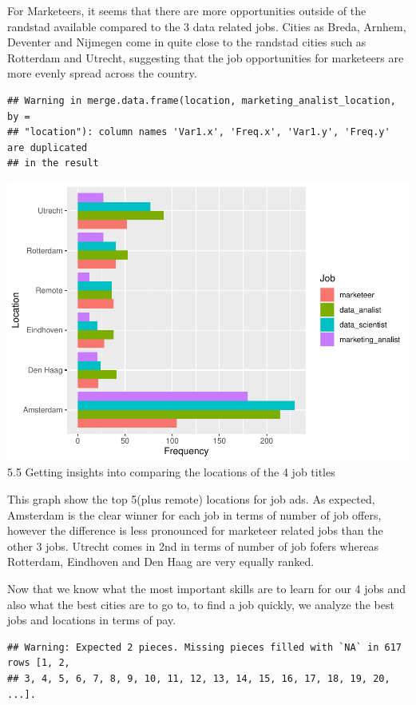 \documentclass[
]{article}
\begin{document}
For Marketeers, it seems that there are more opportunities outside of
the randstad available compared to the 3 data related jobs. Cities as
Breda, Arnhem, Deventer and Nijmegen come in quite close to the randstad
cities such as Rotterdam and Utrecht, suggesting that the job
opportunities for marketeers are more evenly spread across the country.

\begin{verbatim}
## Warning in merge.data.frame(location, marketing_analist_location, by =
## "location"): column names 'Var1.x', 'Freq.x', 'Var1.y', 'Freq.y' are duplicated
## in the result
\end{verbatim}

\includegraphics{analysis_files/figure-latex/unnamed-chunk-31-1.pdf} 5.5
Getting insights into comparing the locations of the 4 job titles

This graph show the top 5(plus remote) locations for job ads. As
expected, Amsterdam is the clear winner for each job in terms of number
of job offers, however the difference is less pronounced for marketeer
related jobs than the other 3 jobs. Utrecht comes in 2nd in terms of
number of job fofers whereas Rotterdam, Eindhoven and Den Haag are very
equally ranked.

Now that we know what the most important skills are to learn for our 4
jobs and also what the best cities are to go to, to find a job quickly,
we analyze the best jobs and locations in terms of pay.

\begin{verbatim}
## Warning: Expected 2 pieces. Missing pieces filled with `NA` in 617 rows [1, 2,
## 3, 4, 5, 6, 7, 8, 9, 10, 11, 12, 13, 14, 15, 16, 17, 18, 19, 20, ...].
\end{verbatim}
\end{document}
